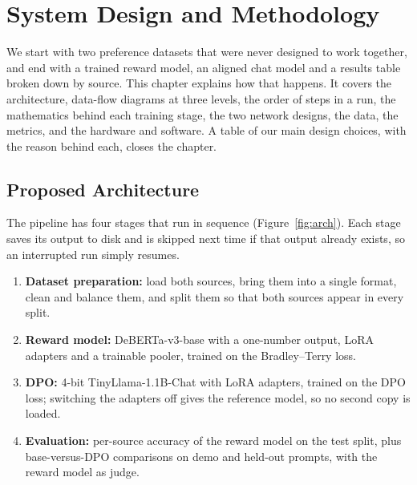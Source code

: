 \chapter{System Design and Methodology}
\label{ch:method}

We start with two preference datasets that were never designed to work together, and end with a trained reward model, an aligned chat model and a results table broken down by source. This chapter explains how that happens. It covers the architecture, data-flow diagrams at three levels, the order of steps in a run, the mathematics behind each training stage, the two network designs, the data, the metrics, and the hardware and software. A table of our main design choices, with the reason behind each, closes the chapter.

\section{Proposed Architecture}
\label{sec:arch}

The pipeline has four stages that run in sequence (Figure~\ref{fig:arch}). Each stage saves its output to disk and is skipped next time if that output already exists, so an interrupted run simply resumes.

\begin{enumerate}
  \item \textbf{Dataset preparation:} load both sources, bring them into a single format, clean and balance them, and split them so that both sources appear in every split.
  \item \textbf{Reward model:} DeBERTa-v3-base with a one-number output, LoRA adapters and a trainable pooler, trained on the Bradley--Terry loss.
  \item \textbf{DPO:} 4-bit TinyLlama-1.1B-Chat with LoRA adapters, trained on the DPO loss; switching the adapters off gives the reference model, so no second copy is loaded.
  \item \textbf{Evaluation:} per-source accuracy of the reward model on the test split, plus base-versus-DPO comparisons on demo and held-out prompts, with the reward model as judge.
\end{enumerate}

